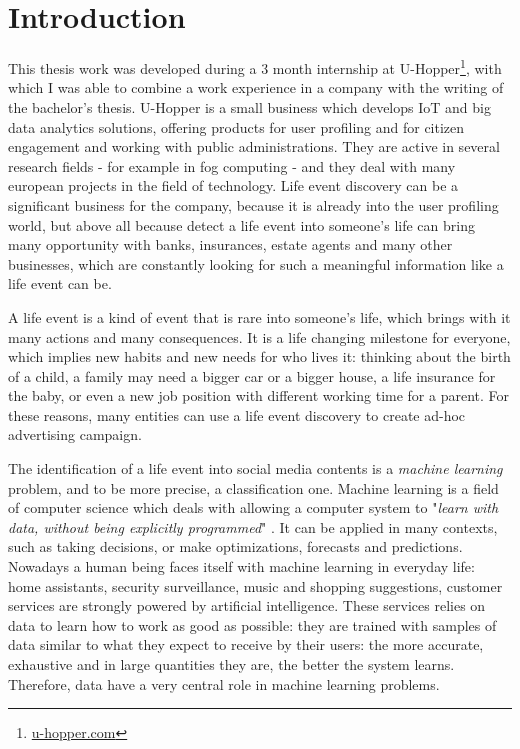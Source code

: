 \chapter{Introduction}
\label{cha:intro}

This thesis work was developed during a 3 month internship at U-Hopper\footnote{\url{u-hopper.com}}, with which I was able to combine a work experience in a company with the writing of the bachelor's thesis. U-Hopper is a small business which develops IoT and big data analytics solutions, offering products for user profiling and for citizen engagement and working with public administrations. They are active in several research fields - for example in fog computing - and they deal with many european projects in the field of technology. Life event discovery can be a significant business for the company, because it is already into the user profiling world, but above all because detect a life event into someone's life can bring many opportunity with banks, insurances, estate agents and many other businesses, which are constantly looking for such a meaningful information like a life event can be.

A life event is a kind of event that is rare into someone's life, which brings with it many actions and many consequences. It is a life changing milestone for everyone, which implies new habits and new needs for who lives it: thinking about the birth of a child, a family may need a bigger car or a bigger house, a life insurance for the baby, or even a new job position with different working time for a parent. For these reasons, many entities can use a life event discovery to create ad-hoc advertising campaign. 

The identification of a life event into social media contents is a \emph{machine learning} problem, and to be more precise, a classification one. Machine learning is a field of computer science which deals with allowing a computer system to "\textit{learn with data, without being explicitly programmed}" \cite{samuel1959some}. It can be applied in many contexts, such as taking decisions, or make optimizations, forecasts and predictions. Nowadays a human being faces itself with machine learning in everyday life: home assistants, security surveillance, music and shopping suggestions, customer services are strongly powered by artificial intelligence. These services relies on data to learn how to work as good as possible: they are trained with samples of data similar to what they expect to receive by their users: the more accurate, exhaustive and in large quantities they are, the better the system learns. Therefore, data have a very central role in machine learning problems.

